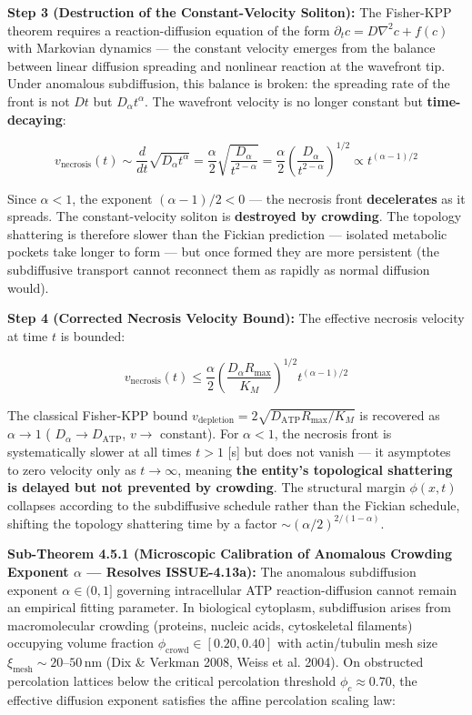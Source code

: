 \documentclass[11pt,a4paper]{article}
\theoremstyle{definition}
\theoremstyle{remark}
\begin{document}
\textbf{Step 3 (Destruction of the Constant-Velocity Soliton):} The Fisher-KPP theorem requires a reaction-diffusion equation of the form $\partial_t c = D \nabla^2 c + f(c)$ with Markovian dynamics — the constant velocity emerges from the balance between linear diffusion spreading and nonlinear reaction at the wavefront tip. Under anomalous subdiffusion, this balance is broken: the spreading rate of the front is not $D t$ but $D_\alpha t^\alpha$. The wavefront velocity is no longer constant but \textbf{time-decaying}:


\begin{equation}
\boxed{v_{\text{necrosis}}(t) \sim \frac{d}{dt} \sqrt{D_\alpha t^\alpha} = \frac{\alpha}{2} \sqrt{\frac{D_\alpha}{t^{2-\alpha}}} = \frac{\alpha}{2}\left(\frac{D_\alpha}{t^{2-\alpha}}\right)^{1/2} \propto t^{(\alpha-1)/2}}
\end{equation}


Since $\alpha < 1$, the exponent $(\alpha-1)/2 < 0$ — the necrosis front \textbf{decelerates} as it spreads. The constant-velocity soliton is \textbf{destroyed by crowding}. The topology shattering is therefore slower than the Fickian prediction — isolated metabolic pockets take longer to form — but once formed they are more persistent (the subdiffusive transport cannot reconnect them as rapidly as normal diffusion would).

\textbf{Step 4 (Corrected Necrosis Velocity Bound):} The effective necrosis velocity at time $t$ is bounded:


\begin{equation}
v_{\text{necrosis}}(t) \leq \frac{\alpha}{2}\left(\frac{D_\alpha R_{\max}}{K_M}\right)^{1/2} t^{(\alpha-1)/2}
\end{equation}


The classical Fisher-KPP bound $v_{\text{depletion}} = 2\sqrt{D_{\text{ATP}}R_{\max}/K_M}$ is recovered as $\alpha \to 1$ ( $D_\alpha \to D_{\text{ATP}}$, $v \to$ constant). For $\alpha < 1$, the necrosis front is systematically slower at all times $t > 1$ [s] but does not vanish — it asymptotes to zero velocity only as $t \to \infty$, meaning \textbf{the entity's topological shattering is delayed but not prevented by crowding}. The structural margin $\phi(x,t)$ collapses according to the subdiffusive schedule rather than the Fickian schedule, shifting the topology shattering time by a factor $\sim (\alpha/2)^{2/(1-\alpha)}$.

\textbf{Sub-Theorem 4.5.1 (Microscopic Calibration of Anomalous Crowding Exponent $\alpha$ — Resolves ISSUE-4.13a):}
The anomalous subdiffusion exponent $\alpha \in (0, 1]$ governing intracellular ATP reaction-diffusion cannot remain an empirical fitting parameter. In biological cytoplasm, subdiffusion arises from macromolecular crowding (proteins, nucleic acids, cytoskeletal filaments) occupying volume fraction $\phi_{\text{crowd}} \in [0.20, 0.40]$ with actin/tubulin mesh size $\xi_{\text{mesh}} \sim 20\text{--}50\,\mathrm{nm}$ (Dix \& Verkman 2008, Weiss et al. 2004). On obstructed percolation lattices below the critical percolation threshold $\phi_c \approx 0.70$, the effective diffusion exponent satisfies the affine percolation scaling law:
\end{document}
